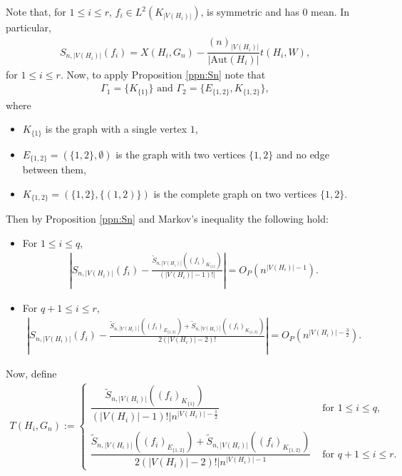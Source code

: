 \documentclass[11pt,reqno]{amsart}
\numberwithin{equation}{section}
\theoremstyle{definition}
\begin{document}
Note that, for $1\leq i\leq r$, $f_{i}\in L^{2}\left(K_{|V(H_{i})|}\right)$, is symmetric and has $0$ mean. In particular, 
\begin{align}\label{eq:Snfcount}
    S_{n,|V(H_i)|}(f_{i}) = X(H_{i}, G_n) - \dfrac{(n)_{|V(H_{i})|}}{|\mathrm{Aut}(H_{i})|}t(H_{i},W),
\end{align}
for $1\leq i\leq r$.  
Now, to apply Proposition \ref{ppn:Sn} note that 
\begin{align*}
    \Gamma_{1} = \{K_{\{1\}}\} \text{ and }\Gamma_{2} = \{E_{\{1,2\}},K_{\{1,2\}}\} , 
\end{align*}
where 
\begin{itemize} 

\item $K_{\{1\}}$ is the graph with a single vertex $1$, 

\item $E_{\{1,2\}} = (\{1, 2\}, \emptyset)$ is the graph with two vertices $\{1,2\}$ and no edge between them, 

\item $K_{\{1,2\}} = (\{1, 2\}, \{(1, 2)\})$ is the complete graph on two vertices $\{1,2\}$. 

\end{itemize} 
Then by Proposition \ref{ppn:Sn} and Markov's inequality the following hold: 
\begin{itemize} 

\item For $1 \leq i \leq q$, 
\begin{align}\label{eq:limit-equiv}
   \left|S_{n,|V(H_i)|}(f_i) - \frac{\tilde{S}_{n,|V(H_i)|}((f_i)_{K_{\{1\}}})}{(|V(H_i)|-1)!| } \right| = O_P(n^{|V(H_i)| - 1}) .  
\end{align} 

\item For $q+1 \leq i \leq r$, 
\begin{align}\label{eq:S_n-equiv-1}
    \left|S_{n,|V(H_i)|}(f_{i}) - \frac{\tilde{S}_{n,|V(H_i)|}((f_i)_{E_{\{1,2\}}}) + \tilde{S}_{n,|V(H_i)|}((f_i)_{{K_{\{1,2\}}}})}{2(|V(H_{i})|-2)!} \right| = O_P(n^{|V(H_i)| - \frac{3}{2}}) . 
\end{align} 

\end{itemize} 
Now, define 
\begin{align}\label{eq:TnHiW}
T(H_i, G_n) := 
\left\{
\begin{array}{cc}
  \dfrac{\tilde{S}_{n,|V(H_i)|}((f_i)_{K_{\{1\}}})}{(|V(H_i)|-1)!| n^{|V(H_i)|-\frac{1}{2}}} & \text{ for } 1 \leq i \leq q , \\ \\ 
 \dfrac{ \tilde{S}_{n,|V(H_i)|}((f_i)_{E_{\{1,2\}}}) + \tilde{S}_{n,|V(H_i)|}((f_i)_{{K_{\{1,2\}}}}) }{2(|V(H_i)|-2)!| n^{|V(H_i)|-1}} & \text{ for } q+1 \leq i \leq r.
\end{array}
\right. 
\end{align} 
\end{document}
